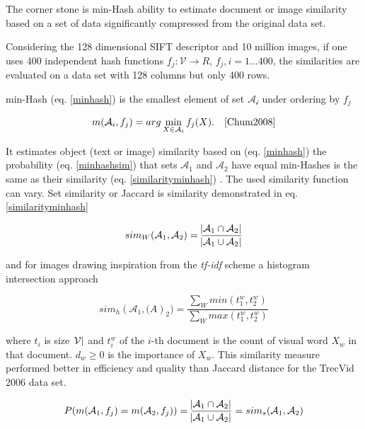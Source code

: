 \documentclass[english,12pt,a4paper,pdftex,elec,utf8]{aaltothesis}
\begin{document}
The corner stone is min-Hash ability to estimate document or image similarity based on a set of data significantly compressed from the original data set.

Considering the 128 dimensional SIFT descriptor and 10 million images, if one uses 400 independent hash functions $f_j:\mathcal{V} \rightarrow R$, $f_j, i = 1 \ldots 400$, the similarities are evaluated on a data set with 128 columns but only 400 rows.

min-Hash (eq. \ref{minhash}) is the smallest element of set $\mathcal{A_i}$ under ordering by $f_j$

\begin{equation}\label{minhash}
m(\mathcal{A}_i,f_j)= arg \min_{X \in \mathcal{A}_i}f_j(X). \quad \cite{Chum2008}
\end{equation}

It estimates object (text or image) similarity based on (eq. \ref{minhash}) the probability (eq. \ref{minhashsim}) that sets $\mathcal{A}_1$ and $\mathcal{A}_2$ have equal min-Hashes is the same as their similarity (eq. \ref{similarityminhash}) \cite{Chum2008}. The used similarity function can vary. Set similarity or Jaccard is similarity demonstrated in eq. \ref{similarityminhash}

\begin{equation}\label{similarityminhash}
sim_W(\mathcal{A}_1,\mathcal{A}_2) = \frac{\abs{\mathcal{A}_1 \cap \mathcal{A}_2}}{\abs{\mathcal{A}_1 \cup \mathcal{A}_2}}
\end{equation}

 and for images drawing inspiration from the \emph{tf-idf} scheme a histogram intersection approach

\begin{equation}\label{similarityminhashimages}
sim_h(\mathcal{A}_1, \mathcal(A)_2)=\frac{\sum_W min(t^w_1,t^w_2)}{\sum_W max(t^w_1,t^w_2)}
\end{equation}

where $t_i$ is size $\abs{\mathcal{V}}$ and $t_i^w$ of the $i$-th document is the count of visual word $X_w$ in that document. $d_w \geq 0$ is the importance of $X_w$. This similarity measure performed better in efficiency and quality than Jaccard distance for the TrecVid 2006 data set. \cite{Chum2008}

\begin{equation}\label{minhashsim}
P(m(\mathcal{A}_1,f_j) = m(\mathcal{A}_2,f_j)) = \frac{\abs{\mathcal{A}_1 \cap \mathcal{A}_2}}{\abs{\mathcal{A}_1 \cup \mathcal{A}_2}} = sim_s(\mathcal{A}_1, \mathcal{A}_2)
\end{equation}
\end{document}
